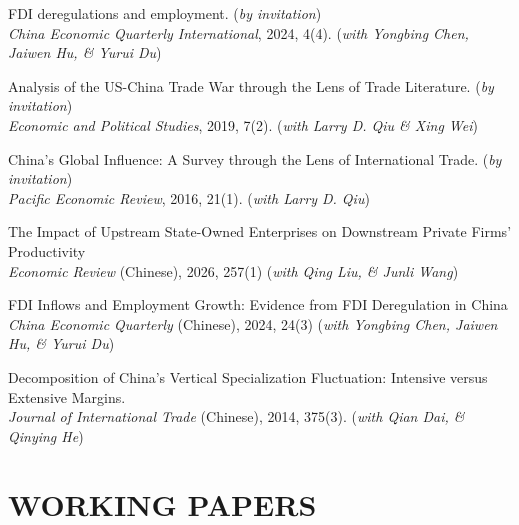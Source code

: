 \documentclass{res}
\begin{document}
\begin{resume}
 \vspace{-1.6em}
 
 
  FDI deregulations and employment.  ({\em by invitation})  \\
 \textit{China Economic Quarterly International}, 2024, 4(4). ({\em with  Yongbing Chen, Jaiwen Hu,  \& Yurui Du}) \\
 
  \vspace{-1.6em}
  
Analysis of the US-China Trade War through the Lens of Trade Literature.  ({\em by invitation})  \\
{\em Economic and Political Studies}, 2019, 7(2). ({\em with Larry D. Qiu  \& Xing Wei}) \\

 \vspace{-1.6em}

China's Global Influence: A Survey through the Lens of International Trade.  ({\em by invitation}) \\
{\em Pacific Economic Review}, 2016, 21(1). ({\em with Larry D. Qiu})  \\
 \vspace{-1.6em}

The Impact of Upstream State-Owned Enterprises on Downstream Private Firms’ Productivity\\
{\em Economic Review} (Chinese), 2026, 257(1) ({\em with Qing Liu,  \& Junli Wang})\\

 \vspace{-1.6em}
 
FDI Inflows and Employment Growth: Evidence from FDI Deregulation in China \\
{\em China Economic Quarterly} (Chinese), 2024, 24(3) ({\em with Yongbing Chen, Jaiwen Hu,  \& Yurui Du}) \\

 
 \vspace{-1.6em}

Decomposition of China's Vertical Specialization Fluctuation: Intensive versus Extensive Margins. \\ {\em Journal of International Trade} (Chinese), 2014, 375(3). ({\em with Qian Dai,  \& Qinying He}) 


\newpage

\section{WORKING PAPERS}    


\end{resume}
\end{document}
